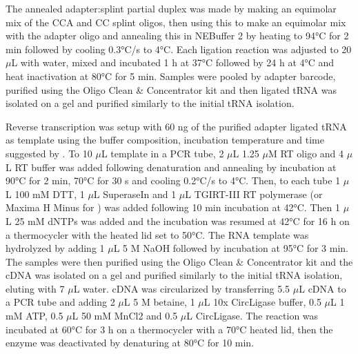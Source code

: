 \documentclass[9pt,lineno]{elife}
\begin{document}
The annealed adapter:splint partial duplex was made by making an equimolar mix of the CCA and CC splint oligos, then using this to make an equimolar mix with the adapter oligo and annealing this in NEBuffer 2 by heating to 94°C for 2 min followed by cooling 0.3°C/s to 4°C.
Each ligation reaction was adjusted to 20 $\mu$L with water, mixed and incubated 1 h at 37°C followed by 24 h at 4°C and heat inactivation at 80°C for 5 min.
Samples were pooled by adapter barcode, purified using the Oligo Clean \& Concentrator kit and then ligated tRNA was isolated on a gel and purified similarly to the initial tRNA isolation.

Reverse transcription was setup with 60 ng of the purified adapter ligated tRNA as template using the buffer composition, incubation temperature and time suggested by \cite{Behrens2021-gb}.
To 10 $\mu$L template in a PCR tube, 2 $\mu$L 1.25 $\mu$M RT oligo and 4 $\mu$L RT buffer was added following denaturation and annealing by incubation at 90°C for 2 min, 70°C for 30 s and cooling 0.2°C/s to 4°C.
Then, to each tube 1 $\mu$L 100 mM DTT, 1 $\mu$L SuperaseIn and 1 $\mu$L TGIRT-III RT polymerase (or Maxima H Minus for ) was added following 10 min incubation at 42°C.
Then 1 $\mu$L 25 mM dNTPs was added and the incubation was resumed at 42°C for 16 h on a thermocycler with the heated lid set to 50°C.
The RNA template was hydrolyzed by adding 1 $\mu$L 5 M NaOH followed by incubation at 95°C for 3 min.
The samples were then purified using the Oligo Clean \& Concentrator kit and the cDNA was isolated on a gel and purified similarly to the initial tRNA isolation, eluting with 7 $\mu$L water.
cDNA was circularized by transferring 5.5 $\mu$L cDNA to a PCR tube and adding 2 $\mu$L 5 M betaine, 1 $\mu$L 10x CircLigase buffer, 0.5 $\mu$L 1 mM ATP, 0.5 $\mu$L 50 mM MnCl2 and 0.5 $\mu$L CircLigase.
The reaction was incubated at 60°C for 3 h on a thermocycler with a 70°C heated lid, then the enzyme was deactivated by denaturing at 80°C for 10 min.
\end{document}
